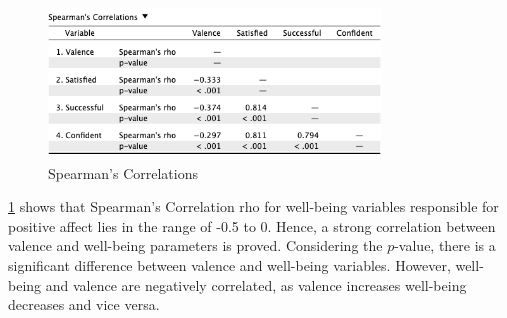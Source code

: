 \documentclass[conference]{IEEEtran}
\begin{document}
		\begin{figure}[H]
		\centerline{\includegraphics[width=88mm,scale=1]{Spearman's Correlations.png}}
		\caption{Spearman's Correlations}
		\label{Spearman's Correlations}
		\end{figure}
	
		\figurename{\ref{Spearman's Correlations}} shows that Spearman's Correlation rho for well-being variables responsible for positive affect lies in the range of -0.5 to 0. Hence, a strong correlation between valence and well-being parameters is proved. Considering the $p$-value, there is a significant difference between valence and well-being variables. However, well-being and valence are negatively correlated, as valence increases well-being decreases and vice versa.
	
	
\end{document}

